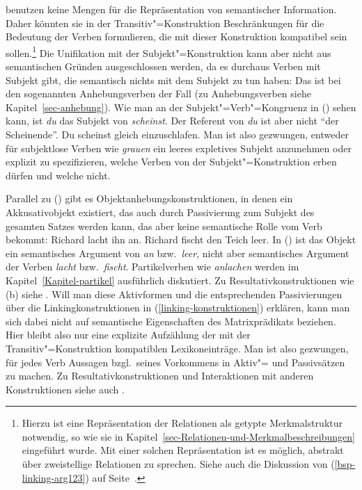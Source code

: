 \citet{MR2001a} benutzen keine Mengen für die Repräsentation von semantischer Information.
Daher könnten sie in der Transitiv"=Konstruktion Beschränkungen für die Bedeutung der Verben
formulieren, die mit dieser Konstruktion kompatibel sein sollen.\footnote{
  Hierzu ist eine Repräsentation der Relationen als getypte Merkmalstruktur notwendig, so
  wie sie in Kapitel~\ref{sec-Relationen-und-Merkmalbeschreibungen} eingeführt wurde. Mit einer solchen
  Repräsentation ist es möglich, abstrakt über zweistellige Relationen zu sprechen. 
  Siehe \zb auch die Diskussion von (\ref{bsp-linking-arg123}) auf
  Seite~\pageref{bsp-linking-arg123}.%
}
Die Unifikation mit der Subjekt"=Konstruktion kann aber nicht aus semantischen Gründen ausgeschlossen
werden, da es durchaus Verben mit Subjekt gibt, die semantisch nichts mit dem Subjekt zu tun haben:
Das ist bei den sogenannten Anhebungsverben der Fall (zu Anhebungsverben
siehe Kapitel~\ref{sec-anhebung}). Wie man an der Subjekt"=Verb"=Kongruenz in ()
sehen kann, ist \emph{du} das Subjekt von \emph{scheinst}. Der Referent von \emph{du} ist aber nicht
"`der Scheinende"'.
\ea
Du scheinst gleich einzuschlafen.
\z
Man ist also gezwungen, entweder für subjektlose Verben wie \emph{grauen} ein leeres expletives
Subjekt anzunehmen oder explizit zu spezifizieren, welche Verben von der Subjekt"=Konstruktion
erben dürfen und welche nicht.


Parallel zu () gibt es Objektanhebungskonstruktionen, in denen ein Akkusativobjekt
existiert, das auch durch Passivierung zum Subjekt des gesamten Satzes werden kann, das
aber keine semantische Rolle vom Verb bekommt:
\eal
\ex Richard lacht ihn an.
\ex Richard fischt den Teich leer.
\zl
In () ist das Objekt ein semantisches Argument von \emph{an} bzw.\ \emph{leer}, nicht aber
semantisches Argument der Verben \emph{lacht} bzw.\ \emph{fischt}.
Partikelverben wie \emph{anlachen} werden im Kapitel~\ref{Kapitel-partikel} ausführlich diskutiert.
Zu Resultativkonstruktionen wie (b) siehe .
Will man diese Aktivformen und die entsprechenden Passivierungen über die Linkingkonstruktionen
in (\ref{linking-konstruktionen}) erklären, kann man sich dabei nicht auf semantische Eigenschaften
des Matrixprädikats beziehen. Hier bleibt also nur eine explizite Aufzählung der mit
der Transitiv"=Konstruktion kompatiblen Lexikoneinträge. Man ist also gezwungen, für jedes Verb
Aussagen bzgl.\ seines Vorkommens in Aktiv"= und Passivsätzen zu machen.
Zu Resultativkonstruktionen und
Interaktionen mit anderen Konstruktionen siehe auch .


